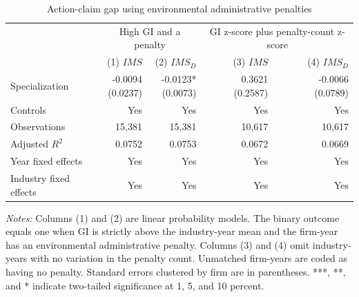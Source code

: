 \begin{table}[H]
    \centering
    \caption{Action-claim gap using environmental administrative penalties}
    \label{tab:penalty_gap}
    \begin{tabular}{lrrrr}
        \toprule
        & \multicolumn{2}{c}{High GI and a penalty} & \multicolumn{2}{c}{GI z-score plus penalty-count z-score} \\
        \cmidrule(lr){2-3} \cmidrule(lr){4-5}
        & (1) \(IMS\) & (2) \(IMS_D\) & (3) \(IMS\) & (4) \(IMS_D\) \\
        \midrule
        Specialization & \shortstack{-0.0094 \\ (0.0237)} & \shortstack{-0.0123* \\ (0.0073)} & \shortstack{0.3621 \\ (0.2587)} & \shortstack{-0.0066 \\ (0.0789)} \\
        Controls & Yes & Yes & Yes & Yes \\
        Observations & 15,381 & 15,381 & 10,617 & 10,617 \\
        Adjusted $R^2$ & 0.0752 & 0.0753 & 0.0672 & 0.0669 \\
        Year fixed effects & Yes & Yes & Yes & Yes \\
        Industry fixed effects & Yes & Yes & Yes & Yes \\
        \bottomrule
    \end{tabular}
    \par\smallskip
    \begin{minipage}{0.95\textwidth}
        \footnotesize
        \textit{Notes:} Columns (1) and (2) are linear probability models. The binary outcome equals one when GI is strictly above the industry-year mean and the firm-year has an environmental administrative penalty. Columns (3) and (4) omit industry-years with no variation in the penalty count. Unmatched firm-years are coded as having no penalty. Standard errors clustered by firm are in parentheses. ***, **, and * indicate two-tailed significance at 1, 5, and 10 percent.
    \end{minipage}
\end{table}
